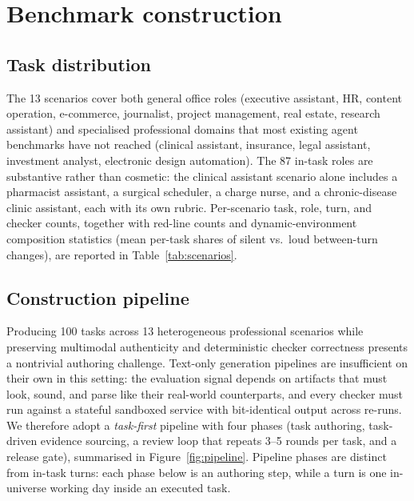 
\section{Benchmark construction}
\label{sec:construction}

\subsection{Task distribution}
\label{sec:construction-distribution}

The 13 scenarios cover both general office roles (executive assistant, HR, content operation, e-commerce, journalist, project management, real estate, research assistant) and specialised professional domains that most existing agent benchmarks have not reached (clinical assistant, insurance, legal assistant, investment analyst, electronic design automation). The 87 in-task roles are substantive rather than cosmetic: the clinical assistant scenario alone includes a pharmacist assistant, a surgical scheduler, a charge nurse, and a chronic-disease clinic assistant, each with its own rubric. Per-scenario task, role, turn, and checker counts, together with red-line counts and dynamic-environment composition statistics (mean per-task shares of silent vs.\ loud between-turn changes), are reported in Table~\ref{tab:scenarios}.



\subsection{Construction pipeline}
\label{sec:construction-pipeline}



Producing 100 tasks across 13 heterogeneous professional scenarios while preserving multimodal authenticity and deterministic checker correctness presents a nontrivial authoring challenge. Text-only generation pipelines are insufficient on their own in this setting: the evaluation signal depends on artifacts that must look, sound, and parse like their real-world counterparts, and every checker must run against a stateful sandboxed service with bit-identical output across re-runs. We therefore adopt a \emph{task-first} pipeline with four phases (task authoring, task-driven evidence sourcing, a review loop that repeats 3--5 rounds per task, and a release gate), summarised in Figure~\ref{fig:pipeline}. Pipeline phases are distinct from in-task turns: each phase below is an authoring step, while a turn is one in-universe working day inside an executed task.

